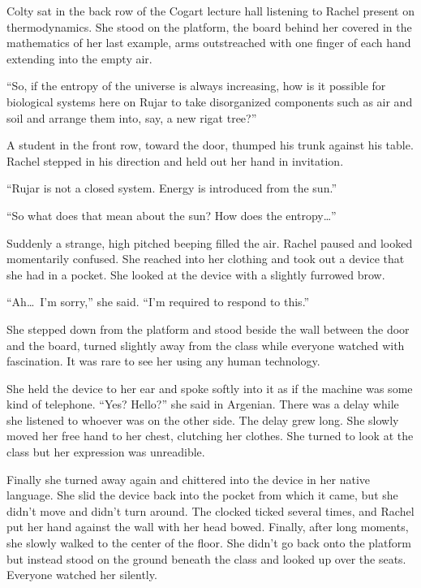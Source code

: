 \spacebreak

Colty sat in the back row of the Cogart lecture hall listening to Rachel present on
thermodynamics. She stood on the platform, the board behind her covered in the mathematics of
her last example, arms outstreached with one finger of each hand extending into the empty air.

``So, if the entropy of the universe is always increasing, how is it possible for biological
systems here on Rujar to take disorganized components such as air and soil and arrange them
into, say, a new rigat tree?''

A student in the front row, toward the door, thumped his trunk against his table. Rachel stepped
in his direction and held out her hand in invitation.

``Rujar is not a closed system. Energy is introduced from the sun.''

``So what does that mean about the sun? How does the entropy\ldots''

Suddenly a strange, high pitched beeping filled the air. Rachel paused and looked momentarily
confused. She reached into her clothing and took out a device that she had in a pocket. She
looked at the device with a slightly furrowed brow.

``Ah\ldots\ I'm sorry,'' she said. ``I'm required to respond to this.''

She stepped down from the platform and stood beside the wall between the door and the board,
turned slightly away from the class while everyone watched with fascination. It was rare to see
her using any human technology.

She held the device to her ear and spoke softly into it as if the machine was some kind of
telephone. ``Yes? Hello?'' she said in Argenian. There was a delay while she listened to whoever
was on the other side. The delay grew long. She slowly moved her free hand to her chest,
clutching her clothes. She turned to look at the class but her expression was unreadible.

Finally she turned away again and chittered into the device in her native language. She slid the
device back into the pocket from which it came, but she didn't move and didn't turn around. The
clocked ticked several times, and Rachel put her hand against the wall with her head bowed.
Finally, after long moments, she slowly walked to the center of the floor. She didn't go back
onto the platform but instead stood on the ground beneath the class and looked up over the
seats. Everyone watched her silently.


